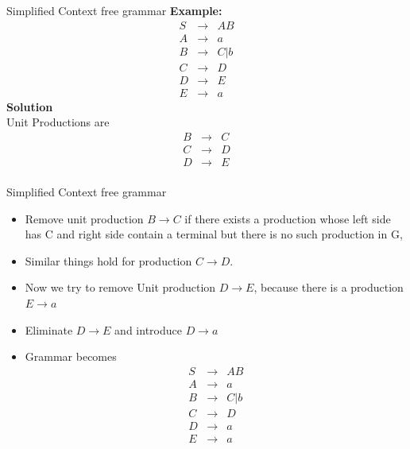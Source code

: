 \documentclass{beamer}
\begin{document}
\begin{frame}{Simplified Context free grammar}
	\textbf{Example:}
	\begin{eqnarray*}
		S&\rightarrow& AB\\
		A&\rightarrow& a\\
		B&\rightarrow&C|b\\
		C&\rightarrow&D\\
		D&\rightarrow&E\\
		E&\rightarrow&a
	\end{eqnarray*}
\textbf{Solution}\\
Unit Productions are
\begin{eqnarray*}
	B&\rightarrow&C\\
	C&\rightarrow&D\\
	D&\rightarrow&E\\
\end{eqnarray*}
\end{frame}
\begin{frame}{Simplified Context free grammar}
\begin{itemize}
	\item Remove unit production $B\rightarrow C$ if there exists a production whose left side has C and right side contain a terminal but there is no such production in G,
	\item Similar things hold for production $C\rightarrow D$.
	\item Now we try to remove Unit production $D\rightarrow E$, because there is a production $E \rightarrow a$
	\item Eliminate $D\rightarrow E$ and introduce $D\rightarrow a$
	\item Grammar becomes
	\begin{eqnarray*}
		S&\rightarrow& AB\\
		A&\rightarrow& a\\
		B&\rightarrow&C|b\\
		C&\rightarrow&D\\
		D&\rightarrow&a\\
		E&\rightarrow&a
	\end{eqnarray*}
\end{itemize}
\end{frame}
\end{document}
